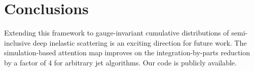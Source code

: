 \section{Conclusions}\label{sec:conclusions}

Extending this framework to gauge-invariant cumulative distributions of
semi-inclusive deep inelastic scattering is an exciting direction for
future work. The simulation-based attention map improves on the
integration-by-parts reduction by a factor of 4 for arbitrary jet
algorithms. Our code is publicly available.

